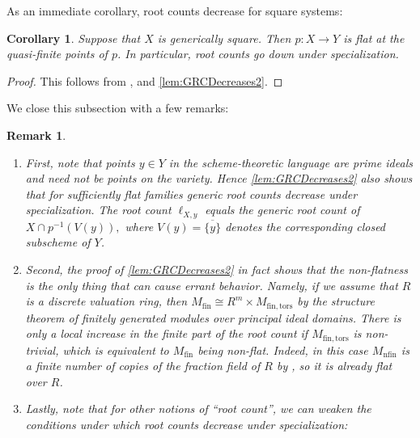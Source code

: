 \documentclass[12pt,reqno,a4paper]{amsart}
\theoremstyle{theoremstyle}
\newtheorem{corollary}[theorem]{Corollary}
\theoremstyle{examplestyle}
\newtheorem{remark}[theorem]{Remark}
\theoremstyle{algorithmstyle}
\begin{document}
As an immediate corollary, root counts decrease for square systems:

\begin{corollary}\label{cor:GRCDecreases2}
  Suppose that $X$ is generically square. Then $p\colon X\to Y$ is flat at the quasi-finite points of $p$.
  In particular, root counts go down under specialization.
\end{corollary}
\begin{proof}
This follows from \cite[\href{https://stacks.math.columbia.edu/tag/00ST}{Lemma 00ST}]{stacks-project}, \cite[\href{https://stacks.math.columbia.edu/tag/00SW}{Lemma 00SW}]{stacks-project} and \cref{lem:GRCDecreases2}.
\end{proof}

We close this subsection with a few remarks:

\begin{remark}\label{rem:rootCounts}\
  \begin{enumerate}[leftmargin=*]
  \item First, note that points $y\in Y$ in the scheme-theoretic language are prime ideals and need not be points on the variety.  Hence \cref{lem:GRCDecreases2} also shows that for sufficiently flat families generic root counts decrease under specialization.  The root count $\ell_{X,y}$ equals the generic root count of
    \begin{math}
      X\cap p^{-1}(V(y)),
    \end{math}
    where $V(y)=\overline{\{y\}}$ denotes the corresponding closed subscheme of $Y$.
  \item Second, the proof of \cref{lem:GRCDecreases2} in fact shows that the non-flatness is the only thing that can cause errant behavior. Namely, if we assume that $R$ is a discrete valuation ring, then $M_{\mathrm{fin}}\cong R^{m}\times M_{\mathrm{fin},\mathrm{tors}}$ by the structure theorem of finitely generated modules over principal ideal domains. There is only a local increase in the finite part of the root count if $M_{\mathrm{fin},\mathrm{tors}}$ is non-trivial, which is equivalent to $M_{\mathrm{fin}}$ being non-flat. Indeed, in this case $M_{\mathrm{nfin}}$ is a finite number of copies of the fraction field of $R$ by \cite[\href{https://stacks.math.columbia.edu/tag/02ML}{Lemma 02ML}]{stacks-project}, so it is already flat over $R$.
  \item Lastly, note that for other notions of ``root count'', we can weaken the conditions under which root counts decrease under specialization:


\end{enumerate}
\end{remark}
\end{document}
